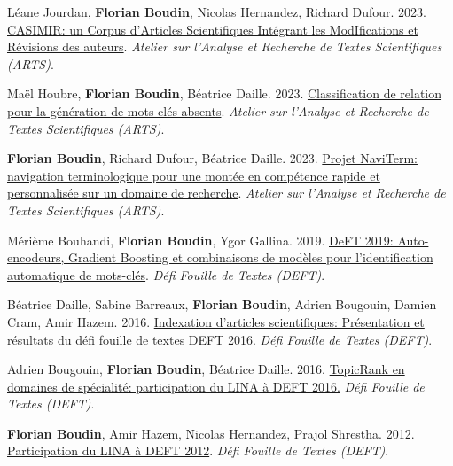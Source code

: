 \item
Léane Jourdan, \textbf{Florian Boudin}, Nicolas Hernandez, Richard Dufour.
2023.
\href{https://aclanthology.org/2023.jeptalnrecital-arts.10.pdf}{CASIMIR: un Corpus d’Articles Scientifiques Intégrant les ModIfications et Révisions des auteurs}.
\textit{Atelier sur l’Analyse et Recherche de Textes Scientifiques (ARTS)}.
\label{jourdan-etal-2023-casimir}

\item 
Maël Houbre, \textbf{Florian Boudin}, Béatrice Daille.
2023.
\href{https://aclanthology.org/2023.jeptalnrecital-arts.8.pdf}{Classification de relation pour la génération de mots-clés absents}.
\textit{Atelier sur l’Analyse et Recherche de Textes Scientifiques (ARTS)}.
\label{houbre-etal-2023-classification}

\item 
\textbf{Florian Boudin}, Richard Dufour, Béatrice Daille.
2023.
\href{https://aclanthology.org/2023.jeptalnrecital-arts.3.pdf}{Projet NaviTerm: navigation terminologique pour une montée en compétence rapide et personnalisée sur un domaine de recherche}.
\textit{Atelier sur l’Analyse et Recherche de Textes Scientifiques (ARTS)}.
\label{boudin-etal-2023-projet}

\item
Mérième Bouhandi, \textbf{Florian Boudin}, Ygor Gallina.
2019.
\href{https://aclanthology.org/2019.jeptalnrecital-deft.6.pdf}{DeFT 2019: Auto-encodeurs, Gradient Boosting et combinaisons de modèles pour l’identification automatique de mots-clés}.
\textit{Défi Fouille de Textes (DEFT)}.
\label{bouhandi-etal-2019-deft}

\item 
Béatrice Daille, Sabine Barreaux, \textbf{Florian Boudin}, Adrien Bougouin, Damien Cram, Amir Hazem.
2016.
\href{https://hal.science/hal-01693785/document}{Indexation d’articles scientifiques: Présentation et résultats du défi fouille de textes DEFT 2016.}
\textit{Défi Fouille de Textes (DEFT)}.
\label{daille-etal-2016-indexation}

\item 
Adrien Bougouin, \textbf{Florian Boudin}, Béatrice Daille.
2016.
\href{https://hal.science/hal-01693767v1/file/DEFT-6.pdf}{TopicRank en domaines de spécialité: participation du LINA à DEFT 2016.}
\textit{Défi Fouille de Textes (DEFT)}.
\label{bougouin-etal-2016-topicrank}

\item 
\textbf{Florian Boudin}, Amir Hazem, Nicolas Hernandez, Prajol Shrestha.
2012.
\href{https://aclanthology.org/W12-1107.pdf}{Participation du LINA à DEFT 2012}.
\textit{Défi Fouille de Textes (DEFT)}.
\label{boudin-etal-2012-participation}